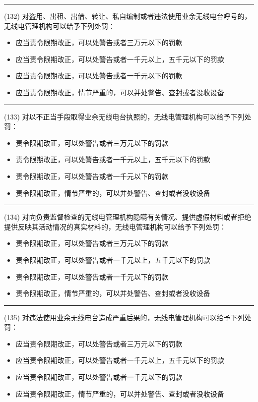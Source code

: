 \documentclass[twocolumn]{ctexart}  %
\begin{document}
\noindent\rule{0.5\textwidth}{1pt}
\heiti (132) 对盗用、出租、出借、转让、私自编制或者违法使用业余无线电台呼号的，无线电管理机构可以给予下列处罚： \songti {\color{gray} [LK0099] }
\begin{itemize}
	\item  应当责令限期改正，可以处警告或者三万元以下的罚款
	\item  应当责令限期改正，可以处警告或者一千元以上，五千元以下的罚款
	\item  应当责令限期改正，可以处警告或者一千元以下的罚款
	\item  应当责令限期改正，情节严重的，可以并处警告、查封或者没收设备
\end{itemize}


\noindent\rule{0.5\textwidth}{1pt}
\heiti (133) 对以不正当手段取得业余无线电台执照的，无线电管理机构可以给予下列处罚： \songti {\color{gray} [LK0100] }
\begin{itemize}
	\item  责令限期改正，可以处警告或者三万元以下的罚款
	\item  责令限期改正，可以处警告或者一千元以上，五千元以下的罚款
	\item  责令限期改正，可以处警告或者一千元以下的罚款
	\item  责令限期改正，情节严重的，可以并处警告、查封或者没收设备
\end{itemize}


\noindent\rule{0.5\textwidth}{1pt}
\heiti (134) 对向负责监督检查的无线电管理机构隐瞒有关情况、提供虚假材料或者拒绝提供反映其活动情况的真实材料的，无线电管理机构可以给予下列处罚： \songti {\color{gray} [LK0101] }
\begin{itemize}
	\item  责令限期改正，可以处警告或者三万元以下的罚款
	\item  责令限期改正，可以处警告或者一千元以上，五千元以下的罚款
	\item  责令限期改正，可以处警告或者一千元以下的罚款
	\item  责令限期改正，情节严重的，可以并处警告、查封或者没收设备
\end{itemize}


\noindent\rule{0.5\textwidth}{1pt}
\heiti (135) 对违法使用业余无线电台造成严重后果的，无线电管理机构可以给予下列处罚： \songti {\color{gray} [LK0102] }
\begin{itemize}
	\item  应当责令限期改正，可以处警告或者三万元以下的罚款
	\item  应当责令限期改正，可以处警告或者一千元以上，五千元以下的罚款
	\item  应当责令限期改正，可以处警告或者一千元以下的罚款
	\item  应当责令限期改正，情节严重的，可以并处警告、查封或者没收设备
\end{itemize}
\end{document}
